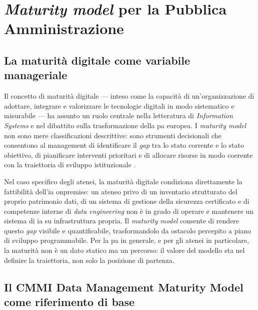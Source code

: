 \section{\textit{Maturity model} per la Pubblica Amministrazione}
\label{sec:maturity-model}

\subsection{La maturità digitale come variabile manageriale}

Il concetto di maturità digitale --- inteso come la capacità di
un'organizzazione di adottare, integrare e valorizzare le tecnologie digitali in modo
sistematico e misurabile --- ha assunto un ruolo centrale nella letteratura di
\textit{Information Systems} e nel dibattito sulla trasformazione della \gls{pa} europea. I
\textit{maturity model} non sono mere classificazioni descrittive: sono
strumenti decisionali che consentono al management di identificare il \textit{gap}
tra lo stato corrente e lo stato obiettivo, di pianificare interventi prioritari e di
allocare risorse in modo coerente con la traiettoria di sviluppo istituzionale
\parencite{Torichnyi2025StrategicMgmt}.

Nel caso specifico degli atenei, la maturità digitale condiziona direttamente la
fattibilità dell'\gls{ia} \gls{onpremise}: un ateneo privo di un inventario strutturato del
proprio patrimonio dati, di un sistema di gestione della sicurezza certificato e di
competenze interne di \textit{data engineering} non è in grado di operare e mantenere un
sistema di \gls{ia} su infrastruttura propria. Il \textit{maturity model} consente di rendere
questo \textit{gap} visibile e quantificabile, trasformandolo da ostacolo percepito a
piano di sviluppo programmabile. Per la \gls{pa} in generale, e per gli atenei in particolare,
la maturità non è un dato statico ma un percorso: il valore del modello sta nel definire
la traiettoria, non solo la posizione di partenza.

\subsection{Il CMMI Data Management Maturity Model come riferimento di base}

